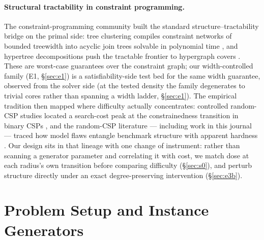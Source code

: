 \documentclass[pdflatex,sn-basic,Numbered]{sn-jnl}
\begin{document}
\paragraph{Structural tractability in constraint programming.}
The constraint-programming community built the standard
structure--tractability bridge on the primal side: tree clustering compiles
constraint networks of bounded treewidth into acyclic join trees solvable in
polynomial time \citep{dechter1989}, and hypertree decompositions push the
tractable frontier to hypergraph covers \citep{gottlob2002}. These are
worst-case guarantees over the constraint graph; our width-controlled family
(E1, \S\ref{sec:e1}) is a satisfiability-side test bed for the same width
guarantee, observed from the solver side (at the tested density the family
degenerates to trivial cores rather than spanning a width ladder,
\S\ref{sec:e1}). The empirical tradition then mapped where
difficulty actually concentrates: controlled random-CSP studies located a
search-cost peak at the constrainedness transition in binary CSPs
\citep{prosser1996}, and the random-CSP literature
--- including work in this journal --- traced how model flaws entangle
benchmark structure with apparent hardness \citep{gent2001}. Our design sits
in that lineage with one change of instrument: rather than scanning a
generator parameter and correlating it with cost, we match dose at each
radius's own transition before comparing difficulty
(\S\ref{sec:s0}), and perturb structure directly under an exact
degree-preserving intervention (\S\ref{sec:e3b}).

\section{Problem Setup and Instance Generators}
\label{sec:setup}
\end{document}
